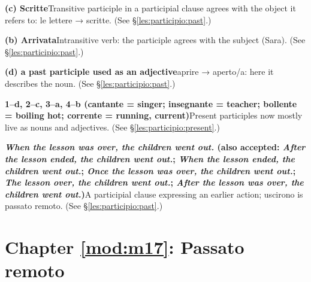 \documentclass[11pt,a4paper,twoside,openright]{book}
\newcommand{\answerheading}[1]{\par\medskip\noindent{\sffamily\bfseries\small #1}\par\nopagebreak}
\begin{document}
\answerheading{\S\ref{les:participio} The participle}\label{ans:participio}
\begin{answers}
\item\relax \textbf{(c) Scritte}\newline Transitive participle in a participial clause agrees with the object it refers to: le lettere → scritte. {\color{muted}(See \S\ref{les:participio:past}.)}
\item\relax \textbf{(b) Arrivata}\newline Intransitive verb: the participle agrees with the subject (Sara). {\color{muted}(See \S\ref{les:participio:past}.)}
\item\relax \textbf{(d) a past participle used as an adjective}\newline aprire → aperto/a: here it describes the noun. {\color{muted}(See \S\ref{les:participio:past}.)}
\item\relax \textbf{1--d, 2--c, 3--a, 4--b {\color{muted}(cantante = singer; insegnante = teacher; bollente = boiling hot; corrente = running, current)}}\newline Present participles now mostly live as nouns and adjectives. {\color{muted}(See \S\ref{les:participio:present}.)}
\item\relax \textbf{\textit{When the lesson was over, the children went out.} {\color{muted}(also accepted: \textit{After the lesson ended, the children went out.}; \textit{When the lesson ended, the children went out.}; \textit{Once the lesson was over, the children went out.}; \textit{The lesson over, the children went out.}; \textit{After the lesson was over, the children went out.})}}\newline A participial clause expressing an earlier action; uscirono is passato remoto. {\color{muted}(See \S\ref{les:participio:past}.)}
\end{answers}

\section*{Chapter \ref{mod:m17}: Passato remoto}
\end{document}
